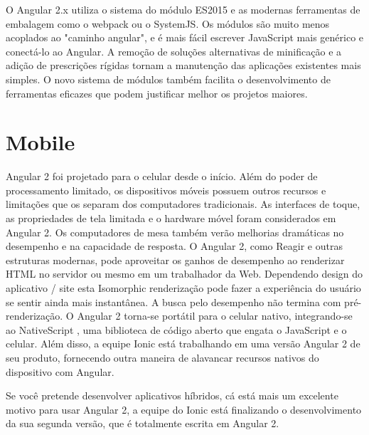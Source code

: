 \documentclass[12pt]{article}
\begin{document}
O Angular 2.x utiliza o sistema do módulo ES2015 e as modernas ferramentas de embalagem como o webpack ou o SystemJS. Os módulos são muito menos acoplados ao "caminho angular", e é mais fácil escrever JavaScript mais genérico e conectá-lo ao Angular. A remoção de soluções alternativas de minificação e a adição de prescrições rígidas tornam a manutenção das aplicações existentes mais simples. O novo sistema de módulos também facilita o desenvolvimento de ferramentas eficazes que podem justificar melhor os projetos maiores.
\section{Mobile}

Angular 2 foi projetado para o celular desde o início. Além do poder de processamento limitado, os dispositivos móveis possuem outros recursos e limitações que os separam dos computadores tradicionais. As interfaces de toque, as propriedades de tela limitada e o hardware móvel foram considerados em Angular 2.
Os computadores de mesa também verão melhorias dramáticas no desempenho e na capacidade de resposta.
O Angular 2, como Reagir e outras estruturas modernas, pode aproveitar os ganhos de desempenho ao renderizar HTML no servidor ou mesmo em um trabalhador da Web. Dependendo design do aplicativo / site esta Isomorphic renderização pode fazer a experiência do usuário se sentir ainda mais instantânea.
A busca pelo desempenho não termina com pré-renderização. O Angular 2 torna-se portátil para o celular nativo, integrando-se ao NativeScript , uma biblioteca de código aberto que engata o JavaScript e o celular. Além disso, a equipe Ionic está trabalhando em uma versão Angular 2 de seu produto, fornecendo outra maneira de alavancar recursos nativos do dispositivo com Angular.

Se você pretende desenvolver aplicativos híbridos, cá está mais um excelente motivo para usar Angular 2, a equipe do Ionic está finalizando o desenvolvimento da sua segunda versão, que é totalmente escrita em Angular 2.



\end{document}
